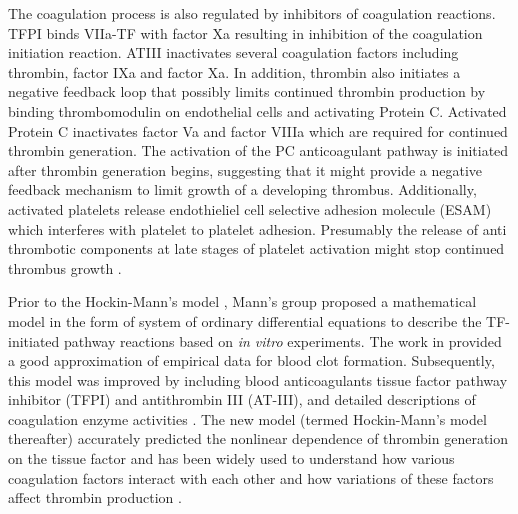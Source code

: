 The coagulation process is also regulated by inhibitors of
coagulation reactions. TFPI binds
 VIIa-TF with factor Xa resulting in inhibition of the
coagulation initiation reaction. ATIII inactivates several
coagulation factors including thrombin, factor IXa and factor Xa. In
addition, thrombin also initiates a negative feedback loop that
possibly limits continued thrombin production by binding
thrombomodulin on endothelial cells and activating Protein C.
Activated Protein C inactivates factor Va and factor VIIIa which are
required for continued thrombin generation. The activation of the PC
anticoagulant pathway is initiated after thrombin generation begins,
suggesting that it might provide a negative feedback mechanism to
limit growth of a developing thrombus. Additionally, activated
platelets release endothieliel cell selective adhesion molecule
(ESAM) which interferes with platelet to platelet adhesion.
Presumably the release of anti thrombotic components at late stages
of platelet activation might stop continued thrombus growth
\cite{ChaDen09,E1,HocJon02,JonMan94a,JonMan94b}.

Prior to the Hockin-Mann's model
\cite{HocJon02}, Mann's group proposed a mathematical model in the form of system of
ordinary differential equations \cite{JonMan94a,JonMan94b} to
describe the TF-initiated pathway reactions based on \emph{in vitro}
experiments. The work in \cite{JonMan94a,JonMan94b} provided a good approximation of
empirical data for blood clot formation. Subsequently, this model
\cite{JonMan94a,JonMan94b} was improved  by including blood
anticoagulants tissue factor pathway inhibitor (TFPI) and
antithrombin III (AT-III), and detailed descriptions of coagulation
enzyme activities \cite{HocJon02}. The new model (termed
Hockin-Mann's model thereafter) accurately predicted the nonlinear
dependence of thrombin generation on the tissue factor and has been
widely used to understand how various coagulation factors interact
with each other and how variations of these factors affect thrombin
production \cite{BPM, BWGMR,E1,HacSer06,KF01,XLMKLCRA,ChaDen09}.

